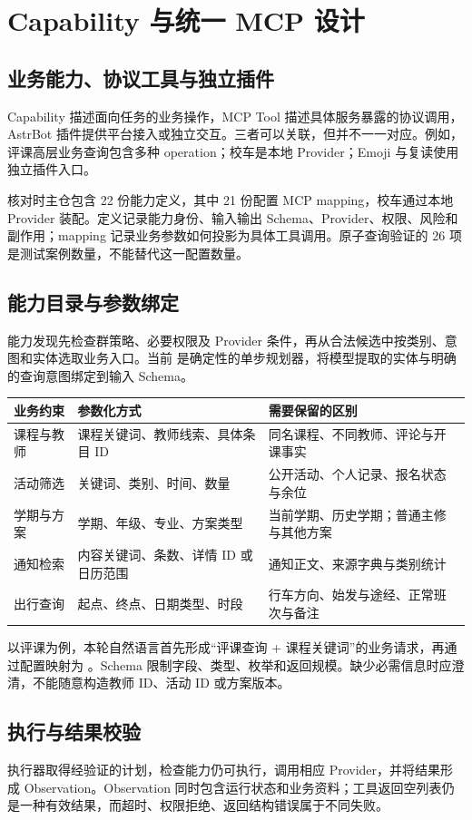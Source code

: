 \section{Capability 与统一 MCP 设计}
\subsection{业务能力、协议工具与独立插件}
Capability 描述面向任务的业务操作，MCP Tool 描述具体服务暴露的协议调用，AstrBot 插件提供平台接入或独立交互。三者可以关联，但并不一一对应。例如，评课高层业务查询包含多种 operation；校车是本地 Provider；Emoji 与复读使用独立插件入口。

核对时主仓包含 22 份能力定义，其中 21 份配置 MCP mapping，校车通过本地 Provider 装配。定义记录能力身份、输入输出 Schema、Provider、权限、风险和副作用；mapping 记录业务参数如何投影为具体工具调用。原子查询验证的 26 项是测试案例数量，不能替代这一配置数量。

\subsection{能力目录与参数绑定}
能力发现先检查群策略、必要权限及 Provider 条件，再从合法候选中按类别、意图和实体选取业务入口。当前  是确定性的单步规划器，将模型提取的实体与明确的查询意图绑定到输入 Schema。

\begin{tabularx}{\textwidth}{@{}L{30mm}Y Y@{}}\toprule
业务约束 & 参数化方式 & 需要保留的区别\\\midrule
课程与教师 & 课程关键词、教师线索、具体条目 ID & 同名课程、不同教师、评论与开课事实\\
活动筛选 & 关键词、类别、时间、数量 & 公开活动、个人记录、报名状态与余位\\
学期与方案 & 学期、年级、专业、方案类型 & 当前学期、历史学期；普通主修与其他方案\\
通知检索 & 内容关键词、条数、详情 ID 或日历范围 & 通知正文、来源字典与类别统计\\
出行查询 & 起点、终点、日期类型、时段 & 行车方向、始发与途经、正常班次与备注\\\bottomrule
\end{tabularx}

以评课为例，本轮自然语言首先形成“评课查询 + 课程关键词”的业务请求，再通过配置映射为 。Schema 限制字段、类型、枚举和返回规模。缺少必需信息时应澄清，不能随意构造教师 ID、活动 ID 或方案版本。

\subsection{执行与结果校验}
执行器取得经验证的计划，检查能力仍可执行，调用相应 Provider，并将结果形成 Observation。Observation 同时包含运行状态和业务资料；工具返回空列表仍是一种有效结果，而超时、权限拒绝、返回结构错误属于不同失败。

